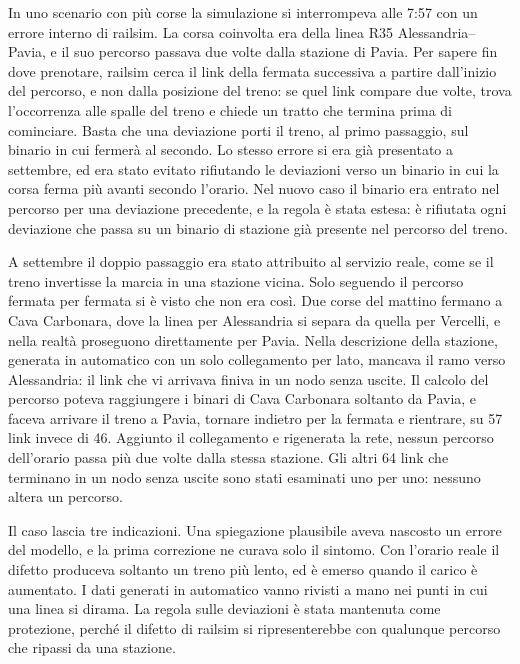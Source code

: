 In uno scenario con più corse la simulazione si interrompeva alle 7:57 con un errore interno di railsim. La corsa coinvolta era della linea R35 Alessandria--Pavia, e il suo percorso passava due volte dalla stazione di Pavia. Per sapere fin dove prenotare, railsim cerca il link della fermata successiva a partire dall'inizio del percorso, e non dalla posizione del treno: se quel link compare due volte, trova l'occorrenza alle spalle del treno e chiede un tratto che termina prima di cominciare. Basta che una deviazione porti il treno, al primo passaggio, sul binario in cui fermerà al secondo. Lo stesso errore si era già presentato a settembre, ed era stato evitato rifiutando le deviazioni verso un binario in cui la corsa ferma più avanti secondo l'orario. Nel nuovo caso il binario era entrato nel percorso per una deviazione precedente, e la regola è stata estesa: è rifiutata ogni deviazione che passa su un binario di stazione già presente nel percorso del treno.

A settembre il doppio passaggio era stato attribuito al servizio reale, come se il treno invertisse la marcia in una stazione vicina. Solo seguendo il percorso fermata per fermata si è visto che non era così. Due corse del mattino fermano a Cava Carbonara, dove la linea per Alessandria si separa da quella per Vercelli, e nella realtà proseguono direttamente per Pavia. Nella descrizione della stazione, generata in automatico con un solo collegamento per lato, mancava il ramo verso Alessandria: il link che vi arrivava finiva in un nodo senza uscite. Il calcolo del percorso poteva raggiungere i binari di Cava Carbonara soltanto da Pavia, e faceva arrivare il treno a Pavia, tornare indietro per la fermata e rientrare, su 57 link invece di 46. Aggiunto il collegamento e rigenerata la rete, nessun percorso dell'orario passa più due volte dalla stessa stazione. Gli altri 64 link che terminano in un nodo senza uscite sono stati esaminati uno per uno: nessuno altera un percorso.

Il caso lascia tre indicazioni. Una spiegazione plausibile aveva nascosto un errore del modello, e la prima correzione ne curava solo il sintomo. Con l'orario reale il difetto produceva soltanto un treno più lento, ed è emerso quando il carico è aumentato. I dati generati in automatico vanno rivisti a mano nei punti in cui una linea si dirama. La regola sulle deviazioni è stata mantenuta come protezione, perché il difetto di railsim si ripresenterebbe con qualunque percorso che ripassi da una stazione.
